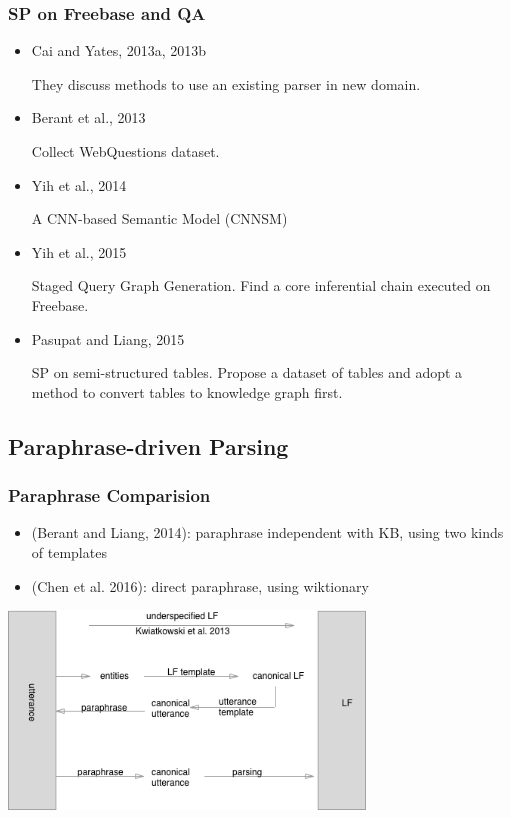 \documentclass{beamer}
\begin{document}
\begin{frame}
    \frametitle{SP on Freebase and QA}
    \begin{itemize}
        \item Cai and Yates, 2013a, 2013b

            They discuss methods to use an existing parser in new domain.

        \item Berant et al., 2013

            Collect WebQuestions dataset.

        \item Yih et al., 2014
            
            A CNN-based Semantic Model (CNNSM)

        \item Yih et al., 2015

            Staged Query Graph Generation. Find a core inferential chain executed on Freebase.

        \item Pasupat and Liang, 2015

            SP on semi-structured tables. Propose a dataset of tables and adopt a method to 
            convert tables to knowledge graph first.

    \end{itemize}
\end{frame}

\subsection{Paraphrase-driven Parsing}

\begin{frame}
    \frametitle{Paraphrase Comparision}

    \begin{itemize}
        \item (Berant and Liang, 2014): paraphrase independent with KB, using two kinds
            of templates
        \item (Chen et al. 2016): direct paraphrase, using wiktionary
    \end{itemize}

    \begin{center}
        \includegraphics[width=9.48cm,height=5.28cm]{img/paraphrase.png}
    \end{center}
\end{frame}
\end{document}
